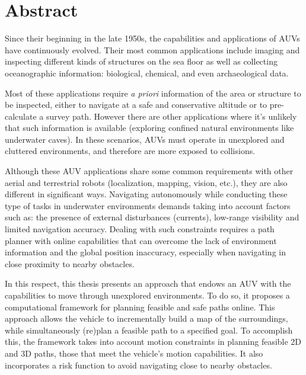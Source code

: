 \begingroup
\let\clearpage\relax
\let\cleardoublepage\relax
\let\cleardoublepage\relax

\chapter*{Abstract}

Since their beginning in the late 1950s, the capabilities and applications of
\acp{AUV} have continuously evolved. Their most common applications include
imaging and inspecting different kinds of structures on the sea floor as well as
collecting oceanographic information: biological, chemical, and even
archaeological data.

Most of these applications require \textit{a priori} information of the area or
structure to be inspected, either to navigate at a safe and conservative
altitude or to pre-calculate a survey path. However there are other applications
where it's unlikely that such information is available (\eg exploring confined
natural environments like underwater caves). In these scenarios, \acp{AUV} must
operate in unexplored and cluttered environments, and therefore are more exposed
to collisions.

Although these \ac{AUV} applications share some common requirements with other
aerial and terrestrial robots (\eg localization, mapping, vision, etc.), they
are also different in significant ways. Navigating autonomously while conducting
these type of tasks in underwater environments demands taking into account
factors such as: the presence of external disturbances (currents), low-range
visibility and limited navigation accuracy. Dealing with such constraints
requires a path planner with online capabilities that can overcome the lack of
environment information and the global position inaccuracy, especially when
navigating in close proximity to nearby obstacles.

In this respect, this thesis presents an approach that endows an \ac{AUV} with the
capabilities to move through unexplored environments. To do so, it
proposes a computational framework for planning feasible and safe paths
online. This approach allows the vehicle to incrementally build a map of
the surroundings, while simultaneously (re)plan a feasible path to a
specified goal. To accomplish this, the framework takes into account motion constraints
in planning feasible 2D and 3D paths, \ie those that meet the vehicle's motion
capabilities. It also incorporates a risk function to avoid navigating close to
nearby obstacles.

